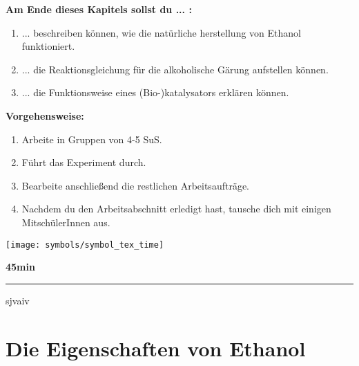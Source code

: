 \documentclass{scrartcl}  %
\begin{document}
			\begin{minipage}{0.7\textwidth}
				\noindent \textbf{Am Ende dieses Kapitels sollst du ... :}
				\begin{enumerate}
					\item ... beschreiben können, wie die natürliche herstellung von Ethanol funktioniert.
					\item ... die Reaktionsgleichung für die alkoholische Gärung aufstellen können.
					\item ... die Funktionsweise eines (Bio-)katalysators erklären können.
				\end{enumerate}
				\textbf{Vorgehensweise:}
				\begin{enumerate}
					\item Arbeite in Gruppen von 4-5 SuS.
					\item Führt das Experiment durch.
					\item Bearbeite anschließend die restlichen Arbeitsaufträge.
					\item Nachdem du den Arbeitsabschnitt erledigt hast, tausche dich mit einigen MitschülerInnen aus. 
				\end{enumerate}
				
			\end{minipage}
			\hspace{0.1\textwidth}
			\begin{minipage}{0.2\textwidth}
				\begin{tcolorbox}
					[enhanced,
					width=0.9\textwidth,
					colback=white,
					colframe=black,
					fonttitle=\sffamily\bfseries\large, 
					title=Zeit,  %
					attach boxed title to top center={xshift=-0.0mm,yshift=-0.50mm},
					boxed title style={skin=enhancedfirst jigsaw,size=small,arc=1mm,bottom=-1mm,colframe=black,height=0.75cm},
					colbacktitle=black,
					drop lifted shadow]
					\centering
					\texttt{[image: symbols/symbol\_tex\_time]}
					
					\begin{center}
						\textbf{45min}
					\end{center}
				\end{tcolorbox}
			\end{minipage}
			
			\begin{center}
				\noindent\rule{18cm}{0.1pt}
			\end{center}

\newpage

sjvaiv

\newpage

		\section{Die Eigenschaften von Ethanol}

				
\end{document}
